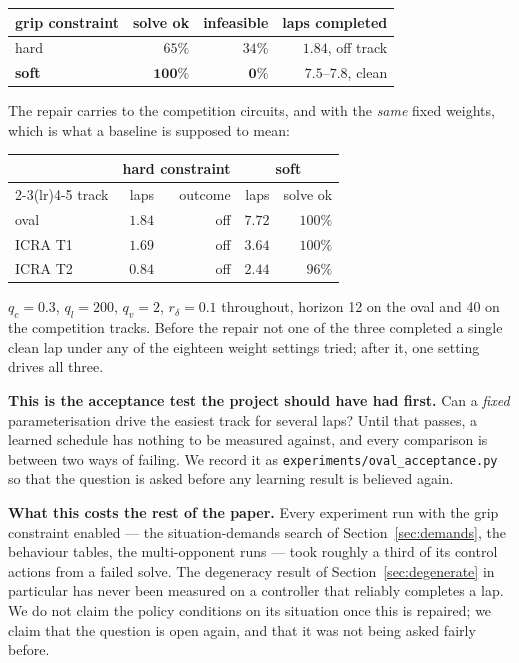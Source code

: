 \documentclass[letterpaper, 10 pt, conference]{ieeeconf}
\begin{document}
\begin{center}
\begin{tabular}{lrrr}
  \toprule
  grip constraint & solve ok & infeasible & laps completed \\
  \midrule
  hard   & $65\%$  & $34\%$ & $1.84$, off track \\
  \textbf{soft} & $\mathbf{100\%}$ & $\mathbf{0\%}$ & $\mathbf{7.5}$--$\mathbf{7.8}$, clean \\
  \bottomrule
\end{tabular}
\end{center}

The repair carries to the competition circuits, and with the \emph{same} fixed
weights, which is what a baseline is supposed to mean:

\begin{center}
\begin{tabular}{lrrrr}
  \toprule
  & \multicolumn{2}{c}{hard constraint} & \multicolumn{2}{c}{soft} \\
  \cmidrule(lr){2-3}\cmidrule(lr){4-5}
  track & laps & outcome & laps & solve ok \\
  \midrule
  oval        & $1.84$ & off & $\mathbf{7.72}$ & $100\%$ \\
  ICRA T1     & $1.69$ & off & $\mathbf{3.64}$ & $100\%$ \\
  ICRA T2     & $0.84$ & off & $\mathbf{2.44}$ & $96\%$ \\
  \bottomrule
\end{tabular}
\end{center}

\noindent
$q_c = 0.3$, $q_l = 200$, $q_v = 2$, $r_\delta = 0.1$ throughout, horizon 12 on
the oval and 40 on the competition tracks. Before the repair not one of the
three completed a single clean lap under any of the eighteen weight settings
tried; after it, one setting drives all three.

\textbf{This is the acceptance test the project should have had first.} Can a
\emph{fixed} parameterisation drive the easiest track for several laps? Until
that passes, a learned schedule has nothing to be measured against, and every
comparison is between two ways of failing. We record it as
\texttt{experiments/oval\_acceptance.py} so that the question is asked before
any learning result is believed again.

\textbf{What this costs the rest of the paper.} Every experiment run with the
grip constraint enabled --- the situation-demands search of
Section~\ref{sec:demands}, the behaviour tables, the multi-opponent runs ---
took roughly a third of its control actions from a failed solve. The
degeneracy result of Section~\ref{sec:degenerate} in particular has never been
measured on a controller that reliably completes a lap. We do not claim the
policy conditions on its situation once this is repaired; we claim that the
question is open again, and that it was not being asked fairly before.
\end{document}
